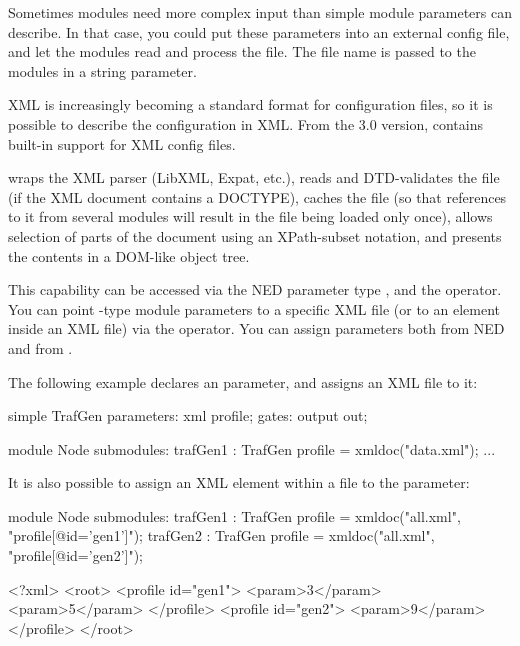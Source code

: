 Sometimes modules need more complex input than simple module parameters
can describe. In that case, you could put these parameters into an external config file,
and let the modules read and process the file. The file name is passed 
to the modules in a string parameter.

XML is increasingly becoming a standard format for configuration
files, so it is possible to describe the configuration in XML.
From the 3.0 version, {\opp} contains built-in support for XML config files.

{\opp} wraps the XML parser (LibXML, Expat, etc.), reads and DTD-validates
the file (if the XML document contains a DOCTYPE), caches the file
(so that references to it from several modules will result in the file being loaded
only once), allows selection of parts of the document using an XPath-subset notation,
and presents the contents in a DOM-like object tree.

This capability can be accessed via the NED parameter type , and the
 operator. You can point -type module parameters
to a specific XML file (or to an element inside an XML file) via the
 operator. You can assign  parameters both from NED
and from .

The following example declares an  parameter, and assigns an
XML file to it:

\begin{ned}
simple TrafGen {
    parameters:
        xml profile;
    gates:
        output out;
}

module Node {
    submodules:
        trafGen1 : TrafGen {
            profile = xmldoc("data.xml");
        }
        ...
}
\end{ned}

It is also possible to assign an XML element within a file to the parameter:

\begin{ned}
module Node {
    submodules:
        trafGen1 : TrafGen {
            profile = xmldoc("all.xml", "profile[@id='gen1']");
        }
        trafGen2 : TrafGen {
            profile = xmldoc("all.xml", "profile[@id='gen2']");
        }
}
\end{ned}

\begin{filelisting}
<?xml>
<root>
  <profile id="gen1">
    <param>3</param>
    <param>5</param>
  </profile>
  <profile id="gen2">
    <param>9</param>
  </profile>
</root>
\end{filelisting}

